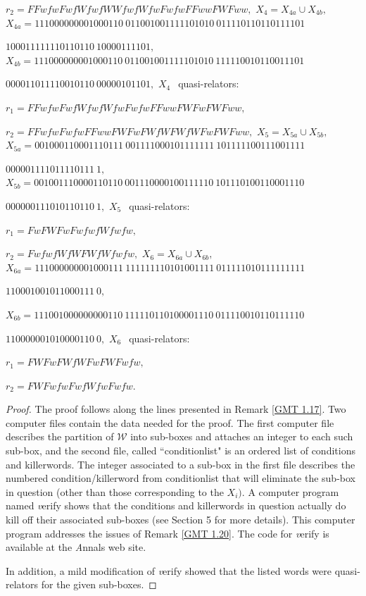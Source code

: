 \begin{proposition}
$r_2 = FFwfwFwfWfwfWWfwfWfwFwfwFFwwFWFww,$
\noindent $X_4 = X_{4a} \cup X_{4b},$
\noindent $X_{4a} = 
111000000001000110\ 
011001001111101010\ 
011110110110111101$\hfill

\hfill  
$100011111110110110\ 
10000111101,$
\noindent $X_{4b} = 
111000000001000110\ 
011001001111101010\ 
111110010110011101$\hfill

\hfill  
$000011011110010110\ 
00000101101,$
\noindent $X_4\ \ $ quasi\/{\textrm -}\/relators\/{\textrm :}

$r_1 = FFwfwFwfWfwfWfwFwfwFFwwFWFwFWFww,$

$r_2 = FFwfwFwfwFFwwFWFwFWfWFWfWFwFWFww,$
\noindent $X_5 = X_{5a} \cup X_{5b},$
\noindent $X_{5a} = 
001000110001110111\ 
001111000101111111\ 
101111100111001111$\hfill

\hfill 
$000001111011110111\ 1,$
\noindent  $X_{5b} = 
001001110000110110\ 
001110000100111110\ 
101110100110001110$\hfill

\hfill  
$000000111010110110\ 1,$
\vglue4pt
\noindent $X_5\ \ $ quasi\/{\textrm -}\/relators\/{\textrm :}

$r_1 = FwFWFwFwfwfWfwfw,$

$r_2 = FwfwfWfWFWfWfwfw,$
\vfil
\noindent $X_6 = X_{6a} \cup X_{6b},$
\vfil
\noindent $X_{6a} = 
111000000001000111\ 
111111110101001111\ 
011111010111111111$\hfill

\hfill  
$110001001011000111\ 0,$

\noindent $X_{6b} = 
111001000000000110\ 
111110110100001110\ 
011110010110111110$\hfill

\hfill  
$110000001010000110\ 0,$
\vglue4pt
\noindent $X_6\ \ $ quasi\/{\textrm -}\/relators\/{\textrm :}\/

$r_1 = FWFwFWfWFwFWFwfw,$

$r_2 = FWFwfwFwfWfwFwfw.$
\end{proposition}

 
\begin{proof}{}  
The proof follows along the lines presented in Remark \ref{GMT 1.17}.  
Two computer files contain the data needed for the proof.   
The first computer file describes the partition of ${\mathcal W}$ into
sub-boxes and attaches an integer to each such sub-box, 
and the second file, called ``conditionlist" is an ordered list of conditions and killerwords.
The integer associated to a sub-box in the first file describes the numbered condition/killerword from   conditionlist that will eliminate the sub-box
in question (other than those corresponding to the $X_i).$ A computer program named {\textit verify} shows
that the conditions and killerwords in question actually do kill off their associated sub-boxes (see Section 5 for more details).  This computer
program addresses the issues of Remark \ref{GMT 1.20}.  The code for {\textit
verify} is available at the {\textit Annals} web site. 

In addition, a mild modification of {\textit verify} showed that the listed words were quasi-relators for the given sub-boxes. 
\end{proof}


